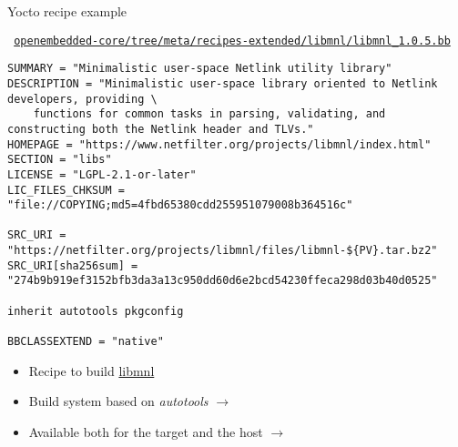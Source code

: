 \begin{frame}[fragile]{Yocto recipe example}
  \begin{block}{{\tt
\href{https://git.openembedded.org/openembedded-core/tree/meta/recipes-extended/libmnl/libmnl_1.0.5.bb}
     {openembedded-core/tree/meta/recipes-extended/libmnl/libmnl\_1.0.5.bb}}}
    {\tiny
\begin{verbatim}
SUMMARY = "Minimalistic user-space Netlink utility library"
DESCRIPTION = "Minimalistic user-space library oriented to Netlink developers, providing \
    functions for common tasks in parsing, validating, and constructing both the Netlink header and TLVs."
HOMEPAGE = "https://www.netfilter.org/projects/libmnl/index.html"
SECTION = "libs"
LICENSE = "LGPL-2.1-or-later"
LIC_FILES_CHKSUM = "file://COPYING;md5=4fbd65380cdd255951079008b364516c"

SRC_URI = "https://netfilter.org/projects/libmnl/files/libmnl-${PV}.tar.bz2"
SRC_URI[sha256sum] = "274b9b919ef3152bfb3da3a13c950dd60d6e2bcd54230ffeca298d03b40d0525"

inherit autotools pkgconfig

BBCLASSEXTEND = "native"
\end{verbatim}
    }
  \end{block}
  \begin{itemize}
  \item Recipe to build
    \href{https://www.netfilter.org/projects/libmnl/}{libmnl}
  \item Build system based on {\em autotools} $\rightarrow$
  \item Available both for the target and the host $\rightarrow$
    \code{BBCLASSEXTEND = "native"}
  \end{itemize}
\end{frame}

